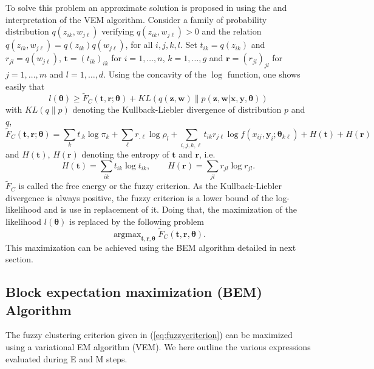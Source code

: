 \documentclass[a4paper]{article}
\newcommand{\br}{\mathbf{r}}
\newcommand{\bt}{\mathbf{t}}
\newcommand{\bw}{\mathbf{w}}
\newcommand{\bx}{\mathbf{x}}
\newcommand{\by}{\mathbf{y}}
\newcommand{\bz}{\mathbf{z}}
\newcommand{\btheta}{\boldsymbol{\theta}}
\newcommand{\argmax}{\mathop{\mathrm{argmax}}}
\begin{document}
To solve this problem an approximate solution is proposed in \cite{Govaert2003} using the \cite{hathaway_86b} and \cite{neal_98} interpretation of the VEM algorithm. Consider a family of probability distribution $q(z_{ik},w_{j\ell})$ verifying $q(z_{ik},w_{j\ell})>0$ and the relation $q(z_{ik},w_{j\ell}) =q(z_{ik}) q(w_{j\ell})$, for all $i,j,k,l$. Set $t_{ik} =q(z_{ik})$
and $r_{jl} = q(w_{j\ell})$, $\bt=(t_{ik})_{ik}$ for $i=1,\ldots,n$, $k=1,\ldots,g$ and
$\br=(r_{jl})_{jl}$ for $j=1,\ldots,m$ and $l=1,\ldots,d$. Using the concavity of the $\log$ function, one shows easily that
\begin{equation}
 l(\btheta) \geq \tilde{F}_C(\bt,\br;\btheta) +
 KL(q(\bz,\bw)\parallel p(\bz,\bw|\bx,\by, \btheta))
\end{equation}
with $KL(q\parallel p)$ denoting the Kullback-Liebler divergence of distribution $p$ and $q$,
\begin{equation} \label{eq:fuzzycriterion}
\tilde{F}_C(\bt,\br;\btheta)=\sum_k t_{.k}\log \pi_k + \sum_{\ell} r_{.\ell} \log\rho_l +\sum_{i,j,k,\ell} t_{ik}r_{j\ell}\log f(x_{ij},\by_i;\btheta_{k\ell})  + H(\bt) + H(\br)
\end{equation}
and $H(\bt)$, $H(\br)$ denoting the entropy of $\bt$ and $\br$, i.e.
\begin{equation*}
H(\bt) = \sum_{ik} t_{ik}\log t_{ik},\qquad H(\br) = \sum_{jl} r_{jl}\log r_{jl}  .
\end{equation*}
$ \tilde{F}_C$ is called the free energy or the fuzzy criterion. As the Kullback-Liebler divergence is always positive, the fuzzy criterion is a lower bound of the log-likelihood and is use in replacement of it. Doing that, the maximization of the likelihood  $l(\btheta)$ is
replaced by the following problem
$$
\argmax_{\bt,\br,\btheta} \tilde{F}_C(\bt,\br,\btheta).
$$
This maximization can be achieved using the BEM algorithm detailed in next section.

\subsection{Block expectation maximization (BEM) Algorithm}

%

The fuzzy clustering criterion given in (\ref{eq:fuzzycriterion})
can be maximized using a variational EM algorithm (VEM).
We here outline the various expressions evaluated during E and M steps.
\end{document}
